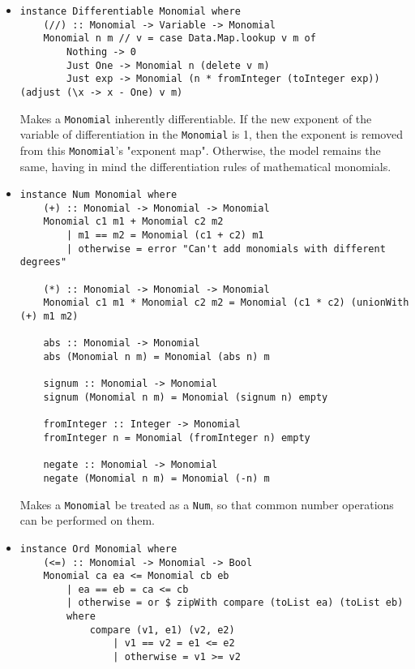 \documentclass[11pt,a4paper]{article}
\begin{document}
\begin{itemize}
    \item \begin{lstlisting}
instance Differentiable Monomial where
    (//) :: Monomial -> Variable -> Monomial
    Monomial n m // v = case Data.Map.lookup v m of
        Nothing -> 0
        Just One -> Monomial n (delete v m)
        Just exp -> Monomial (n * fromInteger (toInteger exp)) (adjust (\x -> x - One) v m)      
    \end{lstlisting}
    
    Makes a \lstinline{Monomial} inherently differentiable. If the new exponent of the variable of differentiation in the \lstinline{Monomial} is 1, then the exponent is removed from this \lstinline{Monomial}'s "exponent map". Otherwise, the model remains the same, having in mind the differentiation rules of mathematical monomials.

    \item \begin{lstlisting}
instance Num Monomial where
    (+) :: Monomial -> Monomial -> Monomial
    Monomial c1 m1 + Monomial c2 m2
        | m1 == m2 = Monomial (c1 + c2) m1
        | otherwise = error "Can't add monomials with different degrees"
    
    (*) :: Monomial -> Monomial -> Monomial
    Monomial c1 m1 * Monomial c2 m2 = Monomial (c1 * c2) (unionWith (+) m1 m2)
    
    abs :: Monomial -> Monomial
    abs (Monomial n m) = Monomial (abs n) m
    
    signum :: Monomial -> Monomial
    signum (Monomial n m) = Monomial (signum n) empty
    
    fromInteger :: Integer -> Monomial
    fromInteger n = Monomial (fromInteger n) empty
    
    negate :: Monomial -> Monomial
    negate (Monomial n m) = Monomial (-n) m
    \end{lstlisting}

    Makes a \lstinline{Monomial} be treated as a \lstinline{Num}, so that common number operations can be performed on them.

    \item \begin{lstlisting}
instance Ord Monomial where
    (<=) :: Monomial -> Monomial -> Bool
    Monomial ca ea <= Monomial cb eb
        | ea == eb = ca <= cb
        | otherwise = or $ zipWith compare (toList ea) (toList eb)
        where
            compare (v1, e1) (v2, e2)
                | v1 == v2 = e1 <= e2
                | otherwise = v1 >= v2
    \end{lstlisting}


\end{itemize}
\end{document}
